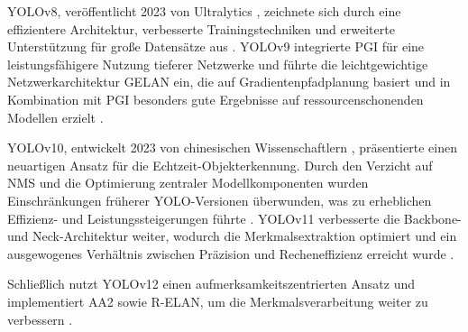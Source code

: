 YOLOv8, veröffentlicht 2023 von Ultralytics \cite{ultralyics_2023}, zeichnete sich durch eine effizientere Architektur, verbesserte Trainingstechniken und erweiterte Unterstützung für große Datensätze aus \cite{Sapkota2025,ultralyics_2023}. YOLOv9 \cite{wang2024_sapkota} integrierte \acrfull{PGI} für eine leistungsfähigere Nutzung tieferer Netzwerke und führte die leichtgewichtige Netzwerkarchitektur \acrfull{GELAN} ein, die auf Gradientenpfadplanung basiert und in Kombination mit \acrshort{PGI} besonders gute Ergebnisse auf ressourcenschonenden Modellen erzielt \cite{Sapkota2025,wang2024_sapkota}.

YOLOv10, entwickelt 2023 von chinesischen Wissenschaftlern \cite{wang2024}, präsentierte einen neuartigen Ansatz für die Echtzeit-Objekterkennung. Durch den Verzicht auf \acrfull{NMS} und die Optimierung zentraler Modellkomponenten wurden Einschränkungen früherer YOLO-Versionen überwunden, was zu erheblichen Effizienz- und Leistungssteigerungen führte \cite{wang2024}. YOLOv11 verbesserte die Backbone- und Neck-Architektur weiter, wodurch die Merkmalsextraktion optimiert und ein ausgewogenes Verhältnis zwischen Präzision und Recheneffizienz erreicht wurde \cite{Sapkota2025,ultralyics_yolov11}.

Schließlich nutzt YOLOv12 einen aufmerksamkeitszentrierten Ansatz und implementiert \acrfull{AA2} sowie \acrfull{R-ELAN}, um die Merkmalsverarbeitung weiter zu verbessern \cite{tian2025,Sapkota2025}.

